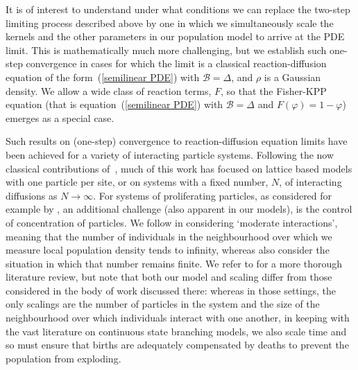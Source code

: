 \documentclass[EJP]{ejpecp} %
\newcommand{\DG}{\mathcal{B}}  %
\newcommand{\citet}[1]{\cite{#1}}
\begin{document}
It is of interest to understand under what conditions we can replace the two-step limiting
process described above by one in which we simultaneously scale the 
kernels
and the other parameters in 
our population model to arrive at the PDE limit.
This is mathematically much more challenging, but we establish such 
one-step convergence in cases for which the limit is a classical 
reaction-diffusion equation of the form~(\ref{semilinear PDE}) with 
$\DG=\Delta$,
and $\rho$ is a Gaussian density. We allow a wide class of reaction terms, $F$, so
that the Fisher-KPP equation 
(that is equation~(\ref{semilinear PDE}) with $\DG=\Delta$ and $F(\varphi)=1-\varphi$)
emerges as a special case.

Such results on (one-step) convergence to reaction-diffusion 
equation limits have been
achieved for a variety of interacting particle systems. 
Following the now classical contributions 
of~\citet{demasi/ferrari/lebowitz:1986, demasi/presutti:1991, oelschlaeger:1985},
much of this work has focused on lattice based models with one particle
per site, or on systems with a fixed number, $N$,
of interacting diffusions as $N\to\infty$.
For systems of proliferating particles,
as considered for example by 
\citet{oelschlaeger:1989, flandoli/leimbach/olivera:2019, flandoli/huang:2021}, 
an additional challenge (also apparent in our models), is 
the control of concentration of particles. 
We follow 
\citet{oelschlaeger:1989, flandoli/leimbach/olivera:2019} in considering
`moderate interactions', meaning that
the number of individuals in the neighbourhood over which we measure local
population density tends to infinity, whereas 
\citet{flandoli/huang:2021} also consider the situation in which
that number remains finite. 
We refer to \citet{flandoli/huang:2021} for a more thorough 
literature review, 
but note that both our model and scaling differ from those considered
in the body of work discussed there: whereas in those settings, the only 
scalings are the number of particles in the system and the size of the
neighbourhood over which individuals interact with one another, in
keeping with the vast literature on continuous state branching models, we 
also scale time and so must ensure that births are 
adequately compensated by deaths to prevent the population from exploding. 
\end{document}
